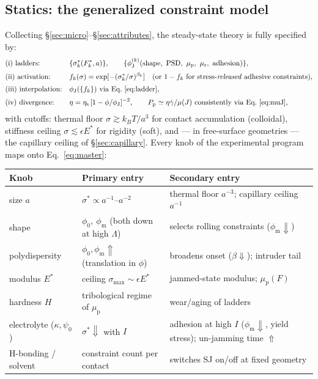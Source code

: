 \documentclass[11pt]{article}
\newcommand{\phiJ}{\phi_{\mathrm{J}}}
\newcommand{\phiO}{\phi_{0}}
\newcommand{\phiM}{\phi_{\mathrm{m}}}
\newcommand{\sigmastar}{\sigma^{*}}
\newcommand{\etas}{\eta_{\mathrm{s}}}
\newcommand{\Fstar}{F^{*}}
\newcommand{\mup}{\mu_{\mathrm{p}}}
\newcommand{\gdot}{\dot{\gamma}}
\begin{document}
\subsection{Statics: the generalized constraint model}
Collecting \S\ref{sec:micro}--\S\ref{sec:attributes}, the steady-state theory is fully specified by:
\begin{align}
&\text{(i) ladders:} && \{\sigmastar_k(\Fstar_k, a)\},\qquad \{\phiJ^{(k)}(\text{shape},\ \mathrm{PSD},\ \mup,\ \mu_{\mathrm{r}},\ \mathrm{adhesion})\}, \nonumber\\[2pt]
&\text{(ii) activation:} && f_k(\sigma) = \exp[-(\sigmastar_k/\sigma)^{\beta_k}] \quad\text{(or } 1-f_k \text{ for stress-\emph{released} adhesive constraints)}, \nonumber\\[2pt]
&\text{(iii) interpolation:} && \phiJ(\{f_k\}) \ \text{via Eq.~\eqref{eq:ladder}}, \nonumber\\[2pt]
&\text{(iv) divergence:} && \eta = \etas\,[1-\phi/\phiJ]^{-2},\qquad
P_{\mathrm{p}} \simeq \eta\gdot/\mu(J) \ \text{consistently via Eq.~\eqref{eq:muJ}},
\label{eq:master}
\end{align}
with cutoffs: thermal floor $\sigma \gtrsim k_BT/a^3$ for contact accumulation (colloidal), stiffness ceiling $\sigma \lesssim \epsilon E^{*}$ for rigidity (soft), and --- in free-surface geometries --- the capillary ceiling of \S\ref{sec:capillary}. Every knob of the experimental program maps onto Eq.~\eqref{eq:master}:
\begin{center}
\begin{tabular}{l l l}
\hline
\textbf{Knob} & \textbf{Primary entry} & \textbf{Secondary entry} \\
\hline
size $a$ & $\sigmastar \propto a^{-1}$--$a^{-2}$ & thermal floor $a^{-3}$; capillary ceiling $a^{-1}$ \\
shape & $\phiO,\ \phiM$ (both down at high $\Lambda$) & selects rolling constraints ($\phiM \Downarrow$) \\
polydispersity & $\phiO,\phiM \Uparrow$ (translation in $\phi$) & broadens onset ($\beta \Downarrow$); intruder tail \\
modulus $E^{*}$ & ceiling $\sigma_{\max}\sim\epsilon E^{*}$ & jammed-state modulus; $\mup(F)$ \\
hardness $H$ & tribological regime of $\mup$ & wear/aging of ladders \\
electrolyte ($\kappa,\psi_0$) & $\sigmastar \Downarrow$ with $I$ & adhesion at high $I$ ($\phiM \Downarrow$, yield stress); un-jamming time $\Uparrow$ \\
H-bonding / solvent & constraint count per contact & switches SJ on/off at fixed geometry \\
\hline
\end{tabular}
\end{center}
\end{document}
